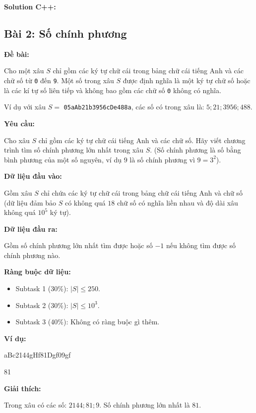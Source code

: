 \documentclass[12pt]{scrartcl}  %
\begin{document}
\textbf{Solution C++:}

\subsection{Bài 2: Số chính phương}

\textbf{Đề bài:}

Cho một xâu $S$ chỉ gồm các ký tự chữ cái trong bảng chữ cái tiếng Anh và các chữ số từ \texttt{0} đến \texttt{9}. 
Một số trong xâu $S$ được định nghĩa là một ký tự chữ số hoặc là các kí tự số liên tiếp và không bao gồm các chữ số \texttt{0} không có nghĩa.

Ví dụ với xâu $S = $ \texttt{05aAb21b3956cDe488a}, các số có trong xâu là: $5; 21; 3956; 488$.

\textbf{Yêu cầu:}

Cho xâu $S$ chỉ gồm các ký tự chữ cái tiếng Anh và các chữ số. Hãy viết chương trình tìm số chính phương lớn nhất trong xâu $S$. (Số chính phương là số bằng bình phương của một số nguyên, ví dụ $9$ là số chính phương vì $9 = 3^2$).


\textbf{Dữ liệu đầu vào:}

Gồm xâu $S$ chỉ chứa các ký tự chữ cái trong bảng chữ cái tiếng Anh và chữ số (dữ liệu đảm bảo $S$ có không quá $18$ chữ số có nghĩa liền nhau và độ dài xâu không quá $10^5$ ký tự). 

\textbf{Dữ liệu đầu ra:}

Gồm số chính phương lớn nhất tìm được hoặc số $-1$ nếu không tìm được số chính phương nào.

\textbf{Ràng buộc dữ liệu:}
\begin{itemize}
    \item Subtask 1 (30\%): $|S| \leq 250$.
    \item Subtask 2 (30\%): $|S| \leq 10^3$.
    \item Subtask 3 (40\%): Không có ràng buộc gì thêm.
\end{itemize}

\textbf{Ví dụ:}
\begin{tcolorbox}[colback=gray!5!white, colframe=blue!50!black, title=Input]
aBc2144gHf81Dgf09gf
\end{tcolorbox}

\begin{tcolorbox}[colback=gray!5!white, colframe=green!50!black, title=Output]
81
\end{tcolorbox}

\textbf{Giải thích:}

Trong xâu có các số: $2144; 81; 9$. Số chính phương lớn nhất là $81$.
\end{document}
